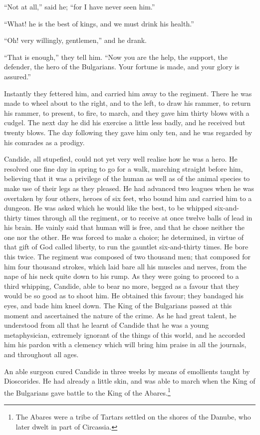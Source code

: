 ``Not at all,'' said he; ``for I have never seen him.''

``What! he is the best of kings, and we must drink his health.''

``Oh! very willingly, gentlemen,'' and he drank.

``That is enough,'' they tell him. ``Now you are the help, the support, the defender, the hero of the Bulgarians. Your fortune is made, and your glory is assured.''

Instantly they fettered him, and carried him away to the regiment. There he was made to wheel about to the right, and to the left, to draw his rammer, to return his rammer, to present, to fire, to march, and they gave him thirty blows with a cudgel. The next day he did his exercise a little less badly, and he received but twenty blows. The day following they gave him only ten, and he was regarded by his comrades as a prodigy.

Candide, all stupefied, could not yet very well realise how he was a hero. He resolved one fine day in spring to go for a walk, marching straight before him, believing that it was a privilege of the human as well as of the animal species to make use of their legs as they pleased. He had advanced two leagues when he was overtaken by four others, heroes of six feet, who bound him and carried him to a dungeon. He was asked which he would like the best, to be whipped six-and-thirty times through all the regiment, or to receive at once twelve balls of lead in his brain. He vainly said that human will is free, and that he chose neither the one nor the other. He was forced to make a choice; he determined, in virtue of that gift of God called liberty, to run the gauntlet six-and-thirty times. He bore this twice. The regiment was composed of two thousand men; that composed for him four thousand strokes, which laid bare all his muscles and nerves, from the nape of his neck quite down to his rump. As they were going to proceed to a third whipping, Candide, able to bear no more, begged as a favour that they would be so good as to shoot him. He obtained this favour; they bandaged his eyes, and bade him kneel down. The King of the Bulgarians passed at this moment and ascertained the nature of the crime. As he had great talent, he understood from all that he learnt of Candide that he was a young metaphysician, extremely ignorant of the things of this world, and he accorded him his pardon with a clemency which will bring him praise in all the journals, and throughout all ages.

An able surgeon cured Candide in three weeks by means of emollients taught by Dioscorides. He had already a little skin, and was able to march when the King of the Bulgarians gave battle to the King of the Abares.\footnote{The Abares were a tribe of Tartars settled on the shores of the Danube, who later dwelt in part of Circassia.}
